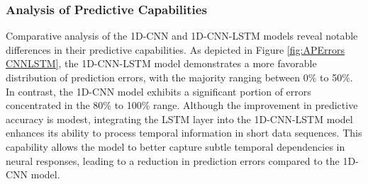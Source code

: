 \documentclass[a4paper]{article}
\begin{document}
\subsubsection{Analysis of Predictive Capabilities}

Comparative analysis of the 1D-CNN and 1D-CNN-LSTM models reveal notable differences in their predictive capabilities. As depicted in Figure \ref{fig:APErrors CNNLSTM}, the 1D-CNN-LSTM model demonstrates a more favorable distribution of prediction errors, with the majority ranging between 0\% to 50\%. In contrast, the 1D-CNN model exhibits a significant portion of errors concentrated in the 80\% to 100\% range. Although the improvement in predictive accuracy is modest, integrating the LSTM layer into the 1D-CNN-LSTM model enhances its ability to process temporal information in short data sequences. This capability allows the model to better capture subtle temporal dependencies in neural responses, leading to a reduction in prediction errors compared to the 1D-CNN model.\\
\end{document}
